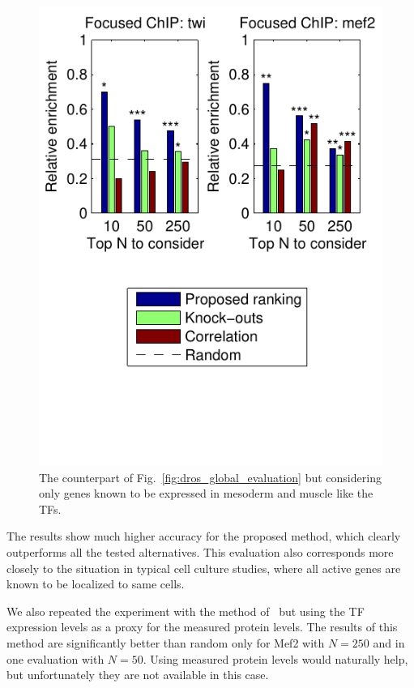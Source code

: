 \documentclass{pnastwo}
\begin{document}
\begin{article}
\begin{figure}[htb]
  \centering
  \includegraphics[trim=0mm 20mm 0mm 0mm]{dros_focused_evaluation}
  \caption{The counterpart of Fig.~\ref{fig:dros_global_evaluation}
    but considering only genes known to be expressed in mesoderm and
    muscle like the TFs.}
  \label{fig:dros_focused_evaluation}
\end{figure}

The results show much higher accuracy for the proposed method, which
clearly outperforms all the tested alternatives.  This evaluation also
corresponds more closely to the situation in typical cell culture
studies, where all active genes are known to be localized to same
cells.

We also repeated the experiment with the method of~\cite{Gatta2008}
but using the TF expression levels as a proxy for the measured protein
levels.  The results of this method are significantly better than
random only for Mef2 with $N=250$ and in one evaluation with $N=50$.
Using measured protein levels would naturally help, but unfortunately
they are not available in this case.


\end{article}
\end{document}

